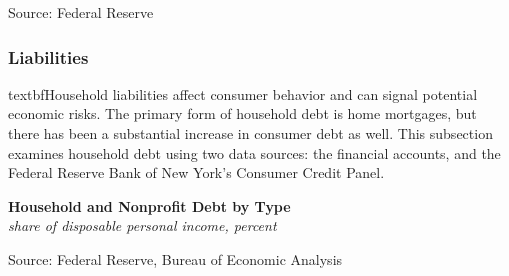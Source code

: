 \documentclass{report}
\makeatletter
\newcommand{\tbllink}[1]{\href{https://raw.githubusercontent.com/bdecon/US-chartbook/master/chartbook/data/#1}{\faTable}}
\newcommand*\short[1]{\expandafter\@gobbletwo\number\numexpr#1\relax}
\newcommand{\sbar}[4]{
		\addplot[ybar stacked, bar width=2.3pt, draw opacity=0, fill=#1] 
			table [x=#2, y=#3, col sep=comma]{#4};}
\newcommand{\absnode}[3]{\node[below right, align=left] at (axis cs: #1,#2) {#3};}
\newcommand{\dateaxisticks}{
		date coordinates in=x, axis line style={draw=none},
		xmax={2024-01-31},
		max space between ticks=40,	    
		xtick={{1990-01-01}, {1992-01-01}, {1994-01-01}, 
			{1996-01-01}, {1998-01-01}, {2000-01-01}, 
			{2002-01-01}, {2004-01-01}, {2006-01-01},
			{2008-01-01}, {2010-01-01}, {2012-01-01}, {2014-01-01},
		    {2016-01-01}, {2018-01-01}, {2020-01-01}, {2022-01-01}, 
		    {2024-01-01}, {2026-01-01}},
		minor xtick={{1989-01-01}, {1991-01-01}, {1993-01-01},
			{1995-01-01}, {1997-01-01}, {1999-01-01}, 
			{2001-01-01}, {2003-01-01}, {2005-01-01}, {2007-01-01},
		    {2009-01-01}, {2011-01-01}, {2013-01-01}, {2015-01-01},
		    {2017-01-01}, {2019-01-01}, {2021-01-01}, {2023-01-01}, 
		    {2025-01-01}, {2027-01-01}},
		enlarge y limits={0.06}, enlarge x limits={0.01},
		xticklabel style={align=center, yshift=-2pt}, tick label style={inner sep=0pt},
		}
\newcommand{\bbar}[2]{extra #1 ticks = {{#2}}, extra #1 tick labels = ,
		extra #1 tick style = {grid=major, grid style={thick, black!25}},}
\newcommand{\rbars}{
		\fill[color=black!10] (axis cs:{1990-07-01},\pgfkeysvalueof{/pgfplots/ymin})
			rectangle (axis cs:{1991-03-01}, \pgfkeysvalueof{/pgfplots/ymax});
		\fill[color=black!10] (axis cs:{2007-12-01},\pgfkeysvalueof{/pgfplots/ymin})
			rectangle (axis cs:{2009-07-01}, \pgfkeysvalueof{/pgfplots/ymax});
		\fill[color=black!10] (axis cs:{2001-03-01},\pgfkeysvalueof{/pgfplots/ymin})
			rectangle (axis cs:{2001-11-01}, \pgfkeysvalueof{/pgfplots/ymax});
		\fill[color=black!10] (axis cs:{2020-02-01},\pgfkeysvalueof{/pgfplots/ymin})
			rectangle (axis cs:{2020-05-01}, \pgfkeysvalueof{/pgfplots/ymax});}
\makeatother
\begin{document}
{\begin{minipage}{0.39\textwidth}
\footnotesize{Source: Federal Reserve} \hfill \tbllink{for.csv}
\end{minipage}

\begin{minipage}{1.0\textwidth}
\subsubsection*{Liabilities}

\small textbf{Household liabilities} affect consumer behavior and can signal potential economic risks. The primary form of household debt is home mortgages, but there has been a substantial increase in consumer debt as well. This subsection examines household debt using two data sources: the financial accounts, and the Federal Reserve Bank of New York's Consumer Credit Panel.

 


\vspace{1mm}

\normalsize \textbf{Household and Nonprofit Debt by Type}\\
\footnotesize{\textit{share of disposable personal income, percent}}
\vspace{3.0cm}

\hspace{4mm} 

\footnotesize{Source: Federal Reserve, Bureau of Economic Analysis} \hfill \tbllink{hhdebt.csv}
\end{minipage}
\newpage
\vspace*{-10mm}

\begin{minipage}{1.0\textwidth}  
\small  
\vspace{1mm}


\end{minipage}}
\end{document}
